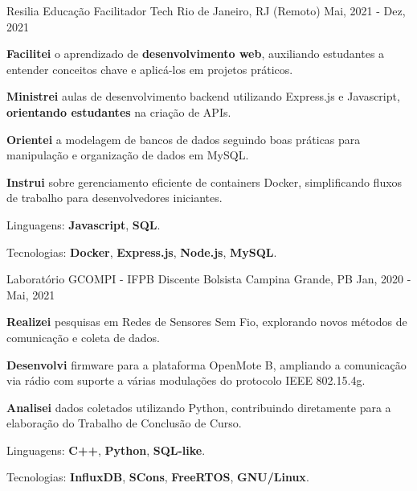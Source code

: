 \begin{cventries}
  \cventry
  {Resilia Educação} %
  {Facilitador Tech} %
  {Rio de Janeiro, RJ (Remoto)} %
  {Mai, 2021 - Dez, 2021} %
  {
    \begin{cvitems}
      \item {\textbf{Facilitei} o aprendizado de \textbf{desenvolvimento web}, auxiliando estudantes a entender conceitos chave e aplicá-los em projetos práticos.}
      \item {\textbf{Ministrei} aulas de desenvolvimento backend utilizando {Express.js} e {Javascript}, \textbf{orientando estudantes} na criação de APIs.}
      \item {\textbf{Orientei} a modelagem de bancos de dados seguindo boas práticas para manipulação e organização de dados em {MySQL}.}
      \item {\textbf{Instrui} sobre gerenciamento eficiente de containers {Docker}, simplificando fluxos de trabalho para desenvolvedores iniciantes.}
      \item {Linguagens: \textbf{Javascript}, \textbf{SQL}.}
      \item {Tecnologias: \textbf{Docker}, \textbf{Express.js}, \textbf{Node.js}, \textbf{MySQL}.}
    \end{cvitems}
  }

  \cventry
  {Laboratório GCOMPI - IFPB} %
  {Discente Bolsista} %
  {Campina Grande, PB} %
  {Jan, 2020 - Mai, 2021} %
  {
    \begin{cvitems}
      \item {\textbf{Realizei} pesquisas em Redes de Sensores Sem Fio, explorando novos métodos de comunicação e coleta de dados.}
      \item {\textbf{Desenvolvi} firmware para a plataforma {OpenMote B}, ampliando a comunicação via rádio com suporte a várias modulações do protocolo {IEEE 802.15.4g}.}
      \item {\textbf{Analisei} dados coletados utilizando {Python}, contribuindo diretamente para a elaboração do Trabalho de Conclusão de Curso.}
      \item {Linguagens: \textbf{C++}, \textbf{Python}, \textbf{SQL-like}.}
      \item {Tecnologias: \textbf{InfluxDB}, \textbf{SCons}, \textbf{FreeRTOS}, \textbf{GNU/Linux}.}
    \end{cvitems}
  }
\end{cventries}
